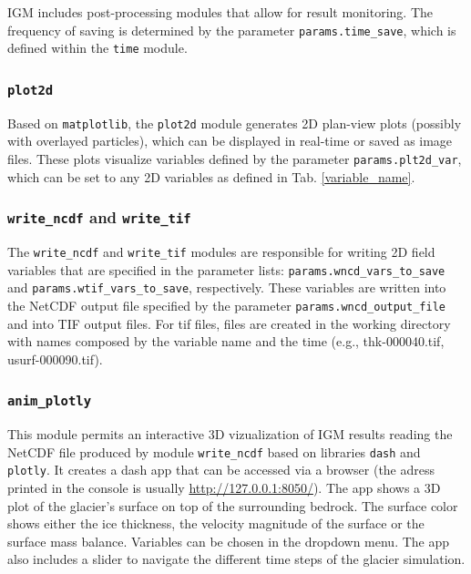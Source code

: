 \documentclass[10pt,twocolumn]{article}
\begin{document}
IGM includes post-processing modules that allow for result monitoring. 
The frequency of saving is determined by the parameter \texttt{params.time\_save}, 
which is defined within the \texttt{time} module.

\subsubsection{\texttt{plot2d}}
\label{module_plot2d}

Based on \texttt{matplotlib},
the \texttt{plot2d} module generates 2D plan-view plots (possibly with overlayed particles), 
which can be displayed in real-time or saved as image files. These plots visualize variables 
defined by the parameter \texttt{params.plt2d\_var}, which can be set to any 2D variables as defined
in Tab. \ref{variable_name}.

\subsubsection{\texttt{write\_ncdf} and \texttt{write\_tif}}
\label{module_write}

The \texttt{write\_ncdf} and \texttt{write\_tif} modules are responsible for writing 
2D field variables that are specified in the parameter lists:
\texttt{params.wncd\_vars\_to\_save} and \texttt{params.wtif\_vars\_to\_save}, 
respectively. These variables are written into the NetCDF output file specified by the 
parameter \texttt{params.wncd\_output\_file} and into TIF output files.
For tif files, files are created in the working directory with names composed by the 
variable name and the time (e.g., thk-000040.tif, usurf-000090.tif).
 
\subsubsection{\texttt{anim\_plotly}}
\label{module_plotly}
 
This module permits an interactive 3D vizualization of IGM results reading the NetCDF file
produced by module \texttt{write\_ncdf} based on libraries \texttt{dash} and \texttt{plotly}.
It creates a dash app that can be accessed via a browser
(the adress printed in the console is usually \url{http://127.0.0.1:8050/}). 
The app shows a 3D plot of the glacier's surface on top of the surrounding bedrock. 
The surface color shows either the ice thickness, the velocity magnitude of the surface
or the surface mass balance. Variables can be chosen in the dropdown menu.
The app also includes a slider to navigate the different time steps of the glacier simulation.
\end{document}
